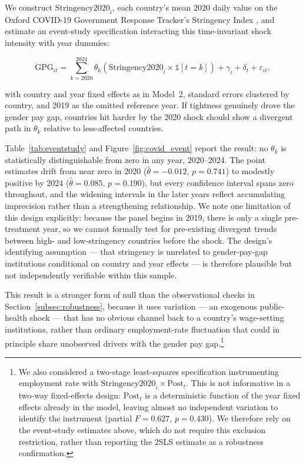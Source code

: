 \documentclass[12pt,a4paper]{article}
\begin{document}
We construct $\text{Stringency2020}_i$, each country's mean 2020 daily value
on the Oxford COVID-19 Government Response Tracker's Stringency Index
\citep{HaleEtAl2021}, and estimate an event-study specification interacting
this time-invariant shock intensity with year dummies:

\begin{equation}
\text{GPG}_{it} = \sum_{k=2020}^{2024} \theta_k \left(\text{Stringency2020}_i
  \times \mathbb{1}[t=k]\right) + \gamma_i + \delta_t + \varepsilon_{it},
\label{eq:eventstudy}
\end{equation}

\noindent with country and year fixed effects as in Model~2, standard errors
clustered by country, and 2019 as the omitted reference year.  If tightness
genuinely drove the gender pay gap, countries hit harder by the 2020 shock
should show a divergent path in $\theta_k$ relative to less-affected
countries.

Table~\ref{tab:eventstudy} and Figure~\ref{fig:covid_event} report the
result: no $\theta_k$ is statistically distinguishable from zero in any year,
2020--2024.  The point estimates drift from near zero in 2020
($\hat\theta=-0.012$, $p=0.741$) to modestly positive by 2024
($\hat\theta=0.085$, $p=0.190$), but every confidence interval spans zero
throughout, and the widening intervals in the later years reflect
accumulating imprecision rather than a strengthening relationship.  We note
one limitation of this design explicitly: because the panel begins in 2019,
there is only a single pre-treatment year, so we cannot formally test for
pre-existing divergent trends between high- and low-stringency countries
before the shock.  The design's identifying assumption --- that stringency
is unrelated to gender-pay-gap institutions conditional on country and year
effects --- is therefore plausible but not independently verifiable within
this sample.

This result is a stronger form of null than the observational checks in
Section~\ref{subsec:robustness}, because it uses variation --- an
exogenous public-health shock --- that has no obvious channel back to a
country's wage-setting institutions, rather than ordinary employment-rate
fluctuation that could in principle share unobserved drivers with the gender
pay gap.\footnote{We also considered a two-stage least-squares specification
instrumenting employment rate with $\text{Stringency2020}_i \times
\text{Post}_t$.  This is not informative in a two-way fixed-effects design:
$\text{Post}_t$ is a deterministic function of the year fixed effects already
in the model, leaving almost no independent variation to identify the
instrument (partial $F=0.627$, $p=0.430$).  We therefore rely on the
event-study estimates above, which do not require this exclusion
restriction, rather than reporting the 2SLS estimate as a robustness
confirmation.}
\end{document}
